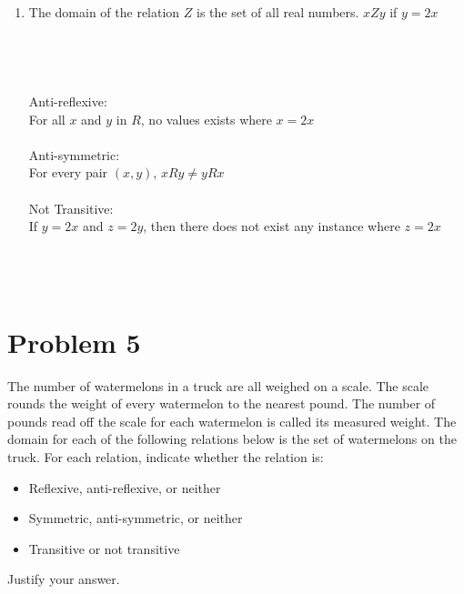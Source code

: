 \documentclass{amsart}
\theoremstyle{definition}
\theoremstyle{Exercise}
\theoremstyle{remark}
\theoremstyle{rule}
\numberwithin{equation}{section}
\begin{document}
\begin{enumerate}[label=(\alph*)]
\item The domain of the relation $Z$ is the set of all real numbers. $xZy$ if $y=2x$\\\\\\\\
\vspace*{0.5in}\\
Anti-reflexive:\\
For all $x$ and $y$ in $R$, no values exists where $x=2x$\\\\

Anti-symmetric:\\
For every pair $(x,y)$, $xRy \neq yRx$\\\\

Not Transitive:\\
If $y=2x$ and $z=2y$, then there does not exist any instance where $z=2x$\\\\
\\\\

\end{enumerate}
\newpage
\vspace*{0.25in}
\section*{Problem 5}

The number of watermelons in a truck are all weighed on a scale. The scale rounds the weight of every watermelon to the nearest pound. The number of pounds read off the scale for each watermelon is called its measured weight. The domain for each of the following relations below is the set of watermelons on the truck. For each relation, indicate whether the relation is:
\\
\begin{itemize}
  \item Reflexive, anti-reflexive, or neither
  \item Symmetric, anti-symmetric, or neither
  \item Transitive or not transitive
\end{itemize}
Justify your answer.\\
\end{document}
